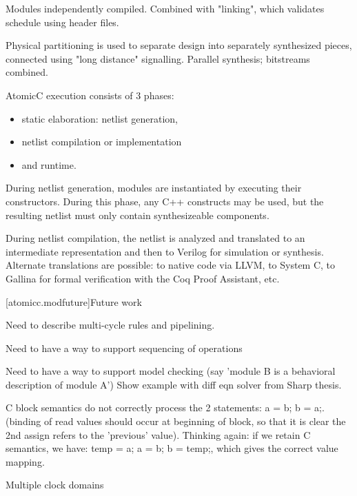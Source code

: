 Modules independently compiled.  Combined with "linking", which validates schedule using header files.

Physical partitioning is used to separate design into separately synthesized pieces, connected using
"long distance" signalling.  Parallel synthesis; bitstreams combined.

AtomicC execution consists of 3 phases:
\begin{itemize}
\item static elaboration: netlist generation, 
\item netlist compilation or implementation
\item and runtime.
\end{itemize}

During netlist
generation, modules are instantiated by executing their
constructors. During this phase, any C++ constructs may be used, but
the resulting netlist must only contain synthesizeable components.

During netlist compilation, the netlist is analyzed and translated to
an intermediate representation and then to Verilog for simulation or
synthesis. Alternate translations are possible: to native code via
LLVM, to System C, to Gallina for formal verification with the Coq
Proof Assistant, etc.

[atomicc.modfuture]{Future work}

Need to describe multi-cycle rules and pipelining.

Need to have a way to support sequencing of operations

Need to have a way to support model checking (say 'module B is a behavioral description of module A')
Show example with diff eqn solver from Sharp thesis.

C block semantics do not correctly process the 2 statements: a = b; b = a;.
(binding of read values should occur at beginning of block, so that it is clear the
2nd assign refers to the 'previous' value).
Thinking again: if we retain C semantics, we have: temp = a; a = b; b = temp;, which
gives the correct value mapping.

Multiple clock domains
